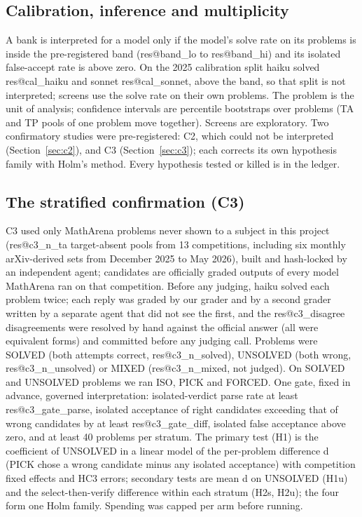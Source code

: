 \documentclass[10pt,twocolumn]{article}
\makeatletter
\newcommand{\res}[1]{\csname res@#1\endcsname}
\makeatother
\begin{document}
\subsection{Calibration, inference and multiplicity}
A bank is interpreted for a model only if the model's solve rate on its problems is inside the pre-registered band (\res{band_lo} to \res{band_hi}) and its isolated false-accept rate is above zero. On the 2025 calibration split haiku solved \res{cal_haiku} and sonnet \res{cal_sonnet}, above the band, so that split is not interpreted; screens use the solve rate on their own problems. The problem is the unit of analysis; confidence intervals are percentile bootstraps over problems (TA and TP pools of one problem move together). Screens are exploratory. Two confirmatory studies were pre-registered: C2, which could not be interpreted (Section~\ref{sec:c2}), and C3 (Section~\ref{sec:c3}); each corrects its own hypothesis family with Holm's method. Every hypothesis tested or killed is in the ledger.

\subsection{The stratified confirmation (C3)}
C3 used only MathArena problems never shown to a subject in this project (\res{c3_n_ta} target-absent pools from 13 competitions, including six monthly arXiv-derived sets from December 2025 to May 2026), built and hash-locked by an independent agent; candidates are officially graded outputs of every model MathArena ran on that competition. Before any judging, haiku solved each problem twice; each reply was graded by our grader and by a second grader written by a separate agent that did not see the first, and the \res{c3_disagree} disagreements were resolved by hand against the official answer (all were equivalent forms) and committed before any judging call. Problems were SOLVED (both attempts correct, \res{c3_n_solved}), UNSOLVED (both wrong, \res{c3_n_unsolved}) or MIXED (\res{c3_n_mixed}, not judged). On SOLVED and UNSOLVED problems we ran ISO, PICK and FORCED. One gate, fixed in advance, governed interpretation: isolated-verdict parse rate at least \res{c3_gate_parse}, isolated acceptance of right candidates exceeding that of wrong candidates by at least \res{c3_gate_diff}, isolated false acceptance above zero, and at least 40 problems per stratum. The primary test (H1) is the coefficient of UNSOLVED in a linear model of the per-problem difference d (PICK chose a wrong candidate minus any isolated acceptance) with competition fixed effects and HC3 errors; secondary tests are mean d on UNSOLVED (H1u) and the select-then-verify difference within each stratum (H2s, H2u); the four form one Holm family. Spending was capped per arm before running.
\end{document}
